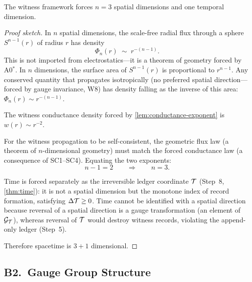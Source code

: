 \begin{theorem}
\label{thm:spacetime-dimension}
The witness framework forces $n = 3$ spatial dimensions and one temporal
dimension.
\begin{proof}[Proof sketch]
In $n$ spatial dimensions, the scale-free radial flux through a sphere
$S^{n-1}(r)$ of radius $r$ has density
\[
  \Phi_n(r) \;\sim\; r^{-(n-1)}.
\]
This is not imported from electrostatics---it is a theorem of geometry
forced by A0$^*$.  In $n$ dimensions, the surface area of $S^{n-1}(r)$
is proportional to $r^{n-1}$.  Any conserved quantity that propagates
isotropically (no preferred spatial direction---forced by gauge invariance,
W8) has density falling as the inverse of this area:
$\Phi_n(r) \sim r^{-(n-1)}$.

The witness conductance density forced by
\cref{lem:conductance-exponent} is $w(r) \sim r^{-2}$.

For the witness propagation to be self-consistent, the geometric flux
law (a theorem of $n$-dimensional geometry) must match the forced
conductance law (a consequence of SC1--SC4).  Equating the two exponents:
\[
  n - 1 = 2 \qquad \Longrightarrow \qquad n = 3.
\]

Time is forced separately as the irreversible ledger coordinate $\mathcal{T}$
(Step~8, \cref{thm:time}): it is not a spatial dimension but the monotone
index of record formation, satisfying $\Delta\mathcal{T} \geq 0$.  Time cannot be
identified with a spatial direction because reversal of a spatial direction
is a gauge transformation (an element of $\mathcal{G}_{\mathcal{T}}$), whereas reversal of
$\mathcal{T}$ would destroy witness records, violating the append-only ledger
(Step~5).

Therefore spacetime is $3 + 1$ dimensional.

\end{proof}
\end{theorem}

\subsection{B2.\ Gauge Group Structure}
\label{sec:physics:gauge}

